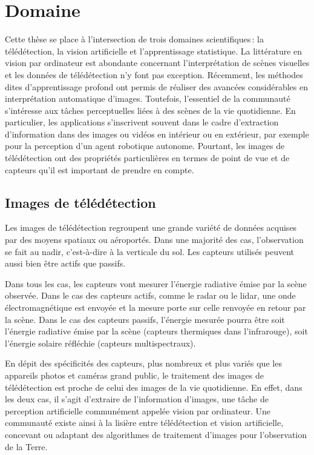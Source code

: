 \section{Domaine}

Cette thèse se place à l'intersection de trois domaines scientifiques\,: la télédétection, la vision artificielle et l'apprentissage statistique. La littérature en vision par ordinateur est abondante concernant l'interprétation de scènes visuelles et les données de télédétection n'y font pas exception. Récemment, les méthodes dites d'apprentissage profond ont permis de réaliser des avancées considérables en interprétation automatique d'images. Toutefois, l'essentiel de la communauté s'intéresse aux tâches perceptuelles liées à des scènes de la vie quotidienne. En particulier, les applications s'inscrivent souvent dans le cadre d'extraction d'information dans des images ou vidéos en intérieur ou en extérieur, par exemple pour la perception d'un agent robotique autonome. Pourtant, les images de télédétection ont des propriétés particulières en termes de point de vue et de capteurs qu'il est important de prendre en compte.

\subsection{Images de télédétection}

Les images de télédétection regroupent une grande variété de données acquises par des moyens spatiaux ou aéroportés. Dans une majorité des cas, l'observation se fait au nadir, c'est-à-dire à la verticale du sol. Les capteurs utilisés peuvent aussi bien être actifs que passifs.

Dans tous les cas, les capteurs vont mesurer l'énergie radiative émise par la scène observée. Dans le cas des capteurs actifs, comme le radar ou le lidar, une onde électromagnétique est envoyée et la mesure porte sur celle renvoyée en retour par la scène. Dans le cas des capteurs passifs, l'énergie mesurée pourra être soit l'énergie radiative émise par la scène (capteurs thermiques dans l'infrarouge), soit l'énergie solaire réfléchie (capteurs multispectraux).

En dépit des spécificités des capteurs, plus nombreux et plus variés que les appareils photos et caméras grand public, le traitement des images de télédétection est proche de celui des images de la vie quotidienne. En effet, dans les deux cas, il s'agit d'extraire de l'information d'images, une tâche de perception artificielle communément appelée vision par ordinateur. Une communauté existe ainsi à la lisière entre télédétection et vision artificielle, concevant ou adaptant des algorithmes de traitement d'images pour l'observation de la Terre.

